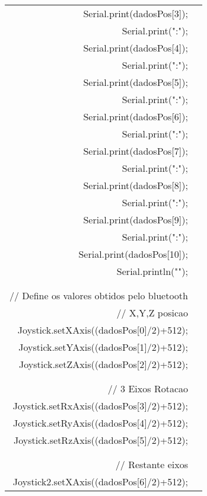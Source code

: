 \begin{longtable}{Rp{15cm}}
\qquad \qquad    Serial.print(dadosPos[3]);   \\
\qquad \qquad    Serial.print(":");  \\
\qquad \qquad    Serial.print(dadosPos[4]);     \\
\qquad \qquad    Serial.print(":");  \\
\qquad \qquad    Serial.print(dadosPos[5]);     \\
\qquad \qquad    Serial.print(":");  \\
\qquad \qquad    Serial.print(dadosPos[6]);  \\
\qquad \qquad    Serial.print(":");  \\
\qquad \qquad    Serial.print(dadosPos[7]);    \\
\qquad \qquad    Serial.print(":");  \\
\qquad \qquad    Serial.print(dadosPos[8]);   \\
\qquad \qquad    Serial.print(":");  \\
\qquad \qquad    Serial.print(dadosPos[9]);     \\
\qquad \qquad    Serial.print(":");  \\
\qquad \qquad    Serial.print(dadosPos[10]);       \\
\qquad \qquad    Serial.println("");\\
\\
\\
\qquad \qquad    // Define os valores obtidos pelo bluetooth \\
\qquad \qquad    // X,Y,Z posicao \\
\qquad \qquad    Joystick.setXAxis((dadosPos[0]/2)+512); \\
\qquad \qquad    Joystick.setYAxis((dadosPos[1]/2)+512);  \\
\qquad \qquad    Joystick.setZAxis((dadosPos[2]/2)+512); \\
    \\
    \\
\qquad \qquad    // 3 Eixos Rotacao \\
\qquad \qquad    Joystick.setRxAxis((dadosPos[3]/2)+512);   \\
\qquad \qquad    Joystick.setRyAxis((dadosPos[4]/2)+512);  \\
\qquad \qquad    Joystick.setRzAxis((dadosPos[5]/2)+512);    \\  
\\
\\
\qquad \qquad    // Restante eixos \\
\qquad \qquad    Joystick2.setXAxis((dadosPos[6]/2)+512); \\

\end{longtable}
